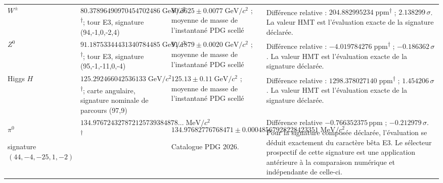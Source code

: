 \begin{longtable}{@{}>{\raggedright\arraybackslash}p{}>{\raggedright\arraybackslash}p{}>{\raggedright\arraybackslash}p{}>{\raggedright\arraybackslash}p{}@{}}
$W^\pm$ & $80.378964\allowbreak{}909704\allowbreak{}547024\allowbreak{}86\;\mathrm{GeV}/c^2$\textsuperscript{\(\dagger\)}; tour E3, signature (94,-1,0,-2,4) & $80.3625\pm0.0077\;\mathrm{GeV}/c^2$ ; moyenne de masse de l’instantané PDG scellé & Différence relative : $204.882995\allowbreak{}234\;\mathrm{ppm}$\textsuperscript{\(\dagger\)} ; $2.138299\,\sigma$. La valeur HMT est l’évaluation exacte de la signature déclarée. \\
$Z^0$ & $91.187533\allowbreak{}444313\allowbreak{}407844\allowbreak{}85\;\mathrm{GeV}/c^2$\textsuperscript{\(\dagger\)}; tour E3, signature (95,-1,-11,0,-4) & $91.1879\pm0.0020\;\mathrm{GeV}/c^2$ ; moyenne de masse de l’instantané PDG scellé & Différence relative : $-4.019784\allowbreak{}276\;\mathrm{ppm}$\textsuperscript{\(\dagger\)} ; $-0.186362\,\sigma$. La valeur HMT est l’évaluation exacte de la signature déclarée. \\
Higgs $H$ & $125.292466\allowbreak{}042536\allowbreak{}133\;\mathrm{GeV}/c^2$\textsuperscript{\(\dagger\)}; carte angulaire, signature nominale de parcours (97,9) & $125.13\pm0.11\;\mathrm{GeV}/c^2$ ; moyenne de masse de l’instantané PDG scellé & Différence relative : $1298.378027\allowbreak{}140\;\mathrm{ppm}$\textsuperscript{\(\dagger\)} ; $1.454206\,\sigma$. La valeur HMT est l’évaluation exacte de la signature déclarée. \\
$\pi^0$\par signature $(44,\allowbreak -4,\allowbreak -25,\allowbreak 1,\allowbreak -2)$ & $134.976724\allowbreak{}327872\allowbreak{}125739\allowbreak{}384878\ldots\;\mathrm{MeV}/c^2$\textsuperscript{\(\dagger\)} & $134.976827\allowbreak{}767684\allowbreak{}71\pm 0.000485\allowbreak{}679282\allowbreak{}284233\allowbreak{}51\;\mathrm{MeV}/c^2$\par\footnotesize Catalogue PDG 2026. & Différence relative $-0.766352\allowbreak{}375\,\mathrm{ppm}$ ; $-0.212979\,\sigma$. Pour la signature composée déclarée, l’évaluation se déduit exactement du caractère bêta E3. Le sélecteur prospectif de cette signature est une application antérieure à la comparaison numérique et indépendante de celle-ci. \\

\end{longtable}
